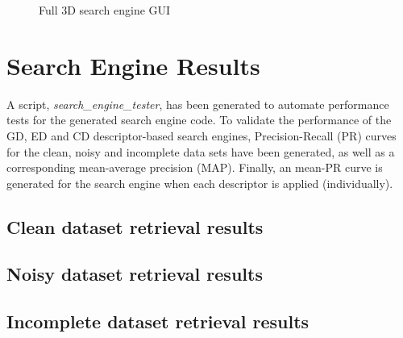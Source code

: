 \documentclass[12pt]{article}
\begin{document}
	\begin{figure}[!h]
		\centering
		\caption{Full 3D search engine GUI}
		\label{fig::tut3}
	\end{figure}

\section*{Search Engine Results}

	\noindent
	A script, \emph{search\_engine\_tester}, has been generated to automate performance tests for the generated search engine code. To validate the performance of the GD, ED and CD descriptor-based search engines, Precision-Recall (PR) curves for the clean, noisy and incomplete data sets have been generated, as well as a corresponding mean-average precision (MAP). Finally, an mean-PR curve is generated for the search engine when each descriptor is applied (individually).

	\subsection*{Clean dataset retrieval results}

	\subsection*{Noisy dataset retrieval results}

	\subsection*{Incomplete dataset retrieval results}
\end{document}
